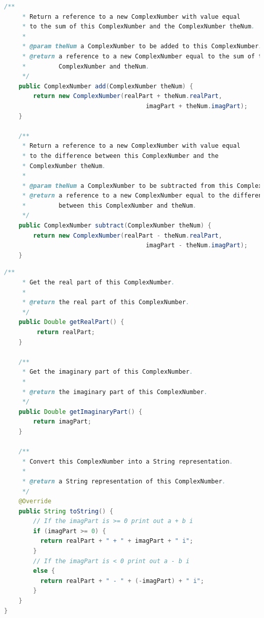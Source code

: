 \documentclass[11pt, xcolor=svgnames]{beamer}
\begin{document}

\begin{frame}[fragile]
\begin{lstlisting}[language=Java,basicstyle=\tiny]
  /**
     * Return a reference to a new ComplexNumber with value equal
     * to the sum of this ComplexNumber and the ComplexNumber theNum.
     *
     * @param theNum a ComplexNumber to be added to this ComplexNumber.
     * @return a reference to a new ComplexNumber equal to the sum of this
     *         ComplexNumber and theNum.
     */
    public ComplexNumber add(ComplexNumber theNum) {
	    return new ComplexNumber(realPart + theNum.realPart,
				                       imagPart + theNum.imagPart);
    }

    /**
     * Return a reference to a new ComplexNumber with value equal
     * to the difference between this ComplexNumber and the
     * ComplexNumber theNum.
     *
     * @param theNum a ComplexNumber to be subtracted from this ComplexNumber.
     * @return a reference to a new ComplexNumber equal to the difference
     *         between this ComplexNumber and theNum.
     */
    public ComplexNumber subtract(ComplexNumber theNum) {
	    return new ComplexNumber(realPart - theNum.realPart,
				                       imagPart - theNum.imagPart);
    }

\end{lstlisting}
\end{frame}



\begin{frame}[fragile]
\begin{lstlisting}[language=JAVA,basicstyle=\tiny]
    /**
     * Get the real part of this ComplexNumber.
     *
     * @return the real part of this ComplexNumber.
     */
    public Double getRealPart() {
	     return realPart;
    }

    /**
     * Get the imaginary part of this ComplexNumber.
     *
     * @return the imaginary part of this ComplexNumber.
     */
    public Double getImaginaryPart() {
	    return imagPart;
    }

    /**
     * Convert this ComplexNumber into a String representation.
     *
     * @return a String representation of this ComplexNumber.
     */
    @Override
    public String toString() {
	    // If the imagPart is >= 0 print out a + b i
	    if (imagPart >= 0) {
	      return realPart + " + " + imagPart + " i";
    	}
	    // If the imagPart is < 0 print out a - b i
	    else {
	      return realPart + " - " + (-imagPart) + " i";
	    }
    }
}
\end{lstlisting}
\end{frame}
\end{document}
